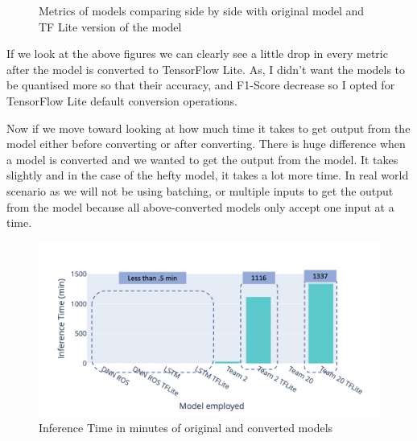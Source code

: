 \begin{figure}[H]
\caption{Metrics of models comparing side by side with original model and TF Lite version of the model}
\label{metricsafterconversion}
\end{figure}

If we look at the above figures we can clearly see a little drop in every metric after the model is converted to TensorFlow Lite. As, I didn't want the models to be quantised more so that their accuracy, and F1-Score decrease so I opted for TensorFlow Lite default conversion operations. 


Now if we move toward looking at how much time it takes to get output from the model either before converting or after converting. There is huge difference when a model is converted and we wanted to get the output from the model. It takes slightly and in the case of the hefty model, it takes a lot more time. In real world scenario as we will not be using batching, or multiple inputs to get the output from the model because all above-converted models only accept one input at a time. 

\begin{figure}[H]
\centering
\includegraphics[scale=0.45]{img/inference_time_of_converted_models.png}
\caption{Inference Time in minutes of original and converted models}
\label{inference_time_of_converted_models}
\end{figure}

